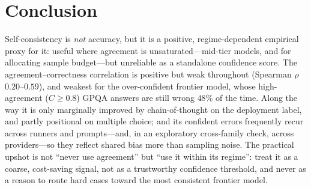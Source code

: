 \documentclass[11pt]{article}
\newcommand{\C}{\textit{C}}
\begin{document}
\section{Conclusion}
\label{sec:conclusion}
Self-consistency is \emph{not} accuracy, but it is a positive, regime-dependent empirical proxy for it:
useful where agreement is unsaturated---mid-tier models, and for allocating sample budget---but unreliable
as a standalone confidence score. The agreement--correctness correlation is positive but weak throughout
(Spearman $\rho$ $0.20$--$0.59$), and weakest for the over-confident frontier model, whose high-agreement
($\C\geq0.8$) GPQA answers are still wrong $48\%$ of the time. Along the way it is only marginally improved by chain-of-thought on the
deployment label, and partly positional on multiple choice; and its confident errors frequently recur
across runners and prompts---and, in an exploratory cross-family check, across providers---so they reflect
shared bias more than sampling noise. The practical upshot is not ``never use agreement'' but ``use it
within its regime'': treat it as a coarse, cost-saving signal, not as a trustworthy confidence threshold,
and never as a reason to route hard cases toward the most consistent frontier model.
\end{document}
